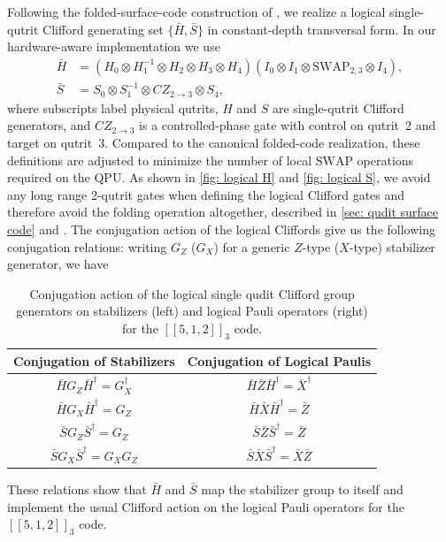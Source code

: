 Following the folded-surface-code construction of
\cite{Moussa2016}, we realize a logical single-qutrit Clifford generating set $\{\bar H,\bar S\}$ in constant-depth transversal form. In our hardware-aware
implementation we use
\begin{align}
  \bar H &=
  (H_0 \otimes H_1^{-1} \otimes H_2 \otimes H_3 \otimes H_4)
  (I_0 \otimes I_1 \otimes \mathrm{SWAP}_{2,3} \otimes I_4), \\
  \bar S &= S_0 \otimes S_1^{-1} \otimes CZ_{2\rightarrow 3} \otimes S_4,
\end{align}
where subscripts label physical qutrits, $H$ and $S$ are single-qutrit Clifford generators, and $CZ_{2\rightarrow 3}$ is a controlled-phase gate with control on qutrit~2 and target on qutrit~3. Compared to the canonical folded-code realization, these definitions are adjusted to minimize the number of local $\mathrm{SWAP}$ operations required on the QPU. As shown in \autoref{fig: logical H} and \autoref{fig: logical S}, we avoid any long range 2-qutrit gates when defining the logical Clifford gates and therefore avoid the folding operation altogether, described in \autoref{sec: qudit surface code} and \cite{Moussa2016}. The conjugation action of the logical Cliffords give us the following conjugation relations: writing $G_Z$ ($G_X$) for a generic $Z$-type ($X$-type) stabilizer generator, we have
\begin{table}[H]
  \centering
  \begin{tabular}{c|c}
    \hline
    Conjugation of Stabilizers
      & Conjugation of Logical Paulis\\
    \hline
    $\bar H G_Z \bar H^\dagger = G_X^\dagger$
      & $\bar H \bar Z \bar H^\dagger = \bar X^\dagger$ \\
    $\bar H G_X \bar H^\dagger = G_Z$
      & $\bar H \bar X \bar H^\dagger = \bar Z$ \\
    $\bar S G_Z \bar S^\dagger = G_Z$
      & $\bar S \bar Z \bar S^\dagger = \bar Z$ \\
    $\bar S G_X \bar S^\dagger = G_X G_Z$
      & $\bar S \bar X \bar S^\dagger = \bar X \bar Z$ \\
    \hline
  \end{tabular}
  \caption{Conjugation action of the logical single qudit Clifford group generators on
  stabilizers (left) and logical Pauli operators (right) for the  $[[5,1,2]]_3$ code.}
  \label{tab:clifford-conjugation}
\end{table}
These relations show that $\bar H$ and $\bar S$ map the stabilizer group to itself and implement the usual Clifford action on the logical Pauli operators for the $[[5,1,2]]_3$ code.

